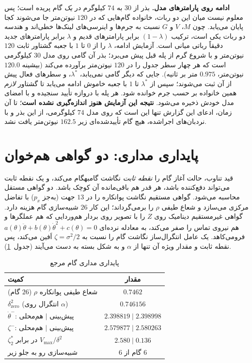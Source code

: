 \documentclass[10pt,twocolumn]{article}
\newcommand{\en}[1]{\lr{#1}}
\newcommand{\nd}{\lr{\textendash}}
\begin{document}
\textbf{ادامه روی پارامترهای مدل.} بذر از $30$ به $74$ کیلوگرم در \emph{یک} گام پریده است؛
پس معلوم نیست میان این دو ربات، خانواده گام‌هایی که در $120$ نیوتن‌متر جا می‌شوند کجا پایان
می‌یابد. چون $M$، $V$ و $G$ نسبت به جرم‌ها و اینرسی‌های لینک‌ها خطی‌اند و هندسه دو ربات یکی
است، ترکیب $(1-\lambda)$ برابر پارامترهای قدیم و $\lambda$ برابر پارامترهای جدید دقیقاً رباتی
میانی است. آزمایش ادامه، $\lambda$ را از $0$ تا $1$ با جعبه گشتاور ثابت $120$ نیوتن‌متر و با
شروع گرم از پله قبل پیش می‌برد؛ بذر آن گامی روی مدل $30$ کیلوگرمی است که هر چهار سطر جدول
\en{3.1} را در $120$ نیوتن‌متر برآورده می‌کند (بیشینه $120.0$ نیوتن‌متر، $0.975$ متر بر ثانیه).
جایی که دیگر گامی نمی‌یابد، $\lambda^*$، و سطرهای فعال پیش از آن ثبت می‌شوند؛ سپس از
$\lambda^*$ تا $1$ با جعبه خاموش ادامه می‌یابد تا گشتاور \emph{لازم} همین خانواده بر حسب جرم
خوانده شود. هر پله با دروازه تأیید سنجیده و با امضای مدل خودش ذخیره می‌شود. \textbf{نتیجه این
آزمایش هنوز اندازه‌گیری نشده است}؛ تا آن زمان، ادعای این گزارش تنها این است که روی مدل
$74$ کیلوگرمی، از این بذر و با نردبان‌های اجراشده، هیچ گام تأییدشده‌ای زیر $162.5$ نیوتن‌متر
یافت نشد.

\section{پایداری مداری: دو گواهی هم‌خوان}
قید تناوب، حالت آغاز گام را \emph{نقطه ثابت} نگاشت گام\nd{}به\nd{}گام می‌کند، و یک نقطه ثابت
می‌تواند دفع‌کننده باشد، هر قدر هم باقی‌مانده آن کوچک باشد. دو گواهی مستقل محاسبه می‌شود.
گواهی مستقیم نگاشت پوانکاره را در $13$ جهت (به‌جز $p_x$) با تفاضل مرکزی می‌سازد و شعاع طیفی
$\rho$ را برمی‌گرداند؛ این کار $26$ شبیه‌سازی گام هزینه دارد. گواهی غیرمستقیم دینامیک روی $Z$
را با تصویر روی بردار هم‌وردایی که هم عملگرها و هم نیروی تماس را صفر می‌کند، به معادله نرده‌ای
$a(\theta)\ddot\theta + b(\theta)\dot\theta^2 + c(\theta) = 0$ فرومی‌کاهد. یک عامل انتگرال‌ساز
نگاشت گام را نسبت به $\zeta=\sigma^2/2$ اَفین می‌کند، پس نقطه ثابت و مقدار ویژه آن تنها از
$\alpha$ و به شکل بسته به دست می‌آیند (جدول~\ref{tab:hzd}).

\begin{table}[H]
    \centering
    \caption{پایداری مداری گام مرجع}
    \label{tab:hzd}
    \small
    \begin{tabular}{lc}
        \toprule
        کمیت & مقدار \\
        \midrule
        شعاع طیفی پوانکاره $\rho$ ($26$ گام) & $0.7462$ \\
        $\delta^2_{\mathrm{zero}}$ (انتگرال روی $\alpha$) & $0.746156$ \\
        $\dot\theta^{-}$: پیش‌بینی $|$ هم‌محلی & $2.398819\;|\;2.398998$ \\
        $\zeta^{-}$: پیش‌بینی $|$ هم‌محلی & $2.579877\;|\;2.580263$ \\
        $\zeta^*_2$ در برابر $V_{\max}/\delta^2$ & $2.580\;|\;0.136$ \\
        شبیه‌سازی رو به جلو زیر \en{PD} & $6$ گام از $6$ \\
        \bottomrule
    \end{tabular}
\end{table}
\end{document}
